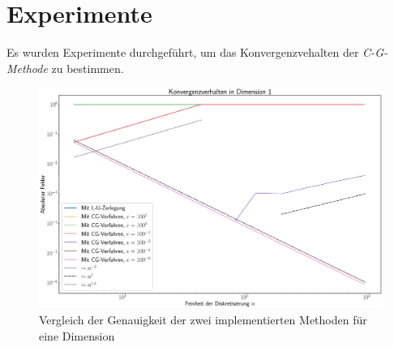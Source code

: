 \documentclass[smallheadings]{scrartcl}
\numberwithin{equation}{section}
\begin{document}
\section{Experimente}

Es wurden Experimente durchgeführt, um das Konvergenzvehalten der \textit{C-G-Methode} zu bestimmen.

%

\begin{figure}[H]
\centering
\includegraphics[width=\textwidth]{Bilder/KonVerh_dim_1.eps}
\caption{Vergleich der Genauigkeit der zwei implementierten Methoden für eine Dimension}
\label{fig:vergleichdim1}
\end{figure}
\end{document}
